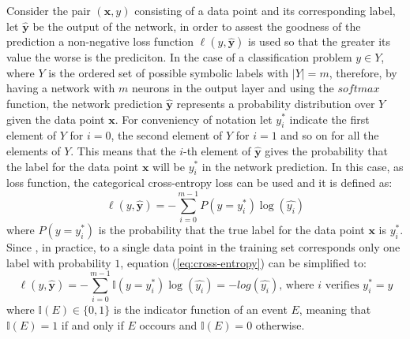 \documentclass[12pt]{article}
\newcommand{\vect}[1]{\boldsymbol{#1}}
\begin{document}
Consider the pair $(\vect{x}, y)$ consisting of a data point and its corresponding label, let $\vect{\hat{{y}}}$ be the output of the network, in order to assest the goodness of the prediction a non-negative loss function $\ell(y,\vect{\hat{y}})$ is used so that the greater its value the worse is the prediciton. In the case of a classification problem $y \in Y$, where $Y$ is the ordered set of possible symbolic labels with $|Y| = m$, therefore, by having a network with $m$ neurons in the output layer and using the $softmax$ function, the network prediction $\vect{\hat{y}}$ represents a probability distribution over $Y$ given the data point $\vect{x}$. For conveniency of notation let $y^*_i$ indicate the first element of $Y$ for $i = 0$, the second element of $Y$ for $i = 1$ and so on for all the elements of $Y$. This means that the $i$-th element of $\vect{\hat{y}}$ gives the probability that the label for the data point $\vect{x}$ will be $y^*_i$ in the network prediction. In this case, as loss function, the categorical cross-entropy loss can be used and it is defined as:
\begin{equation}
\label{eq:cross-entropy}
\ell(y,\vect{\hat{y}}) = -\sum_{i=0}^{m-1}{P(y = y^*_i)\log(\hat{y_i})} 
\end{equation}
where $P(y = y^*_i)$ is the probability that the true label for the data point $\vect{x}$ is $y^*_i$. Since , in practice, to a single data point in the training set corresponds only one label with probability $1$, 
equation (\ref{eq:cross-entropy}) can be simplified to:
$$
\ell(y,\vect{\hat{y}}) = -\sum_{i=0}^{m-1}{\mathbb{I}(y = y^*_i)\log(\hat{y_i})}  = -log(\hat{y_i}) \text{, where } i \text{ verifies } y^*_i = y
$$
where $\mathbb{I}(E) \in \{0, 1\}$ is the indicator function of an event $E$, meaning that $\mathbb{I}(E) = 1$ if and only if $E$ occours and $\mathbb{I}(E) = 0$ otherwise.
\end{document}
